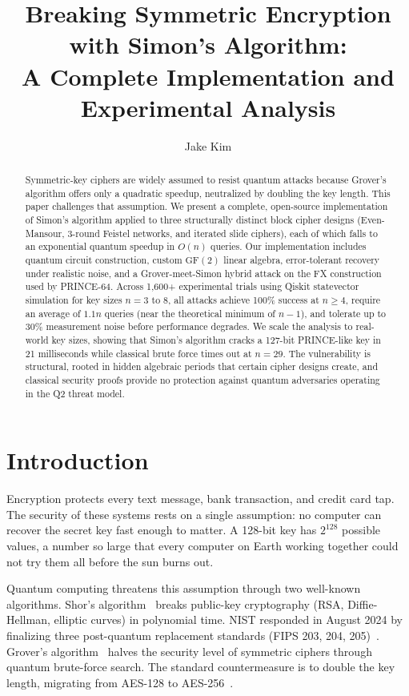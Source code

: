 \documentclass[11pt]{article}
\title{Breaking Symmetric Encryption with Simon's Algorithm:\\A Complete Implementation and Experimental Analysis}
\author{Jake Kim}
\affil{Quantum and Optics Lab, Thomas Jefferson High School for Science and Technology}
\date{}
\begin{document}
\maketitle

\begin{abstract}
Symmetric-key ciphers are widely assumed to resist quantum attacks because Grover's algorithm offers only a quadratic speedup, neutralized by doubling the key length. This paper challenges that assumption. We present a complete, open-source implementation of Simon's algorithm applied to three structurally distinct block cipher designs (Even-Mansour, 3-round Feistel networks, and iterated slide ciphers), each of which falls to an exponential quantum speedup in $O(n)$ queries. Our implementation includes quantum circuit construction, custom $\text{GF}(2)$ linear algebra, error-tolerant recovery under realistic noise, and a Grover-meet-Simon hybrid attack on the FX construction used by PRINCE-64. Across 1,600+ experimental trials using Qiskit statevector simulation for key sizes $n = 3$ to $8$, all attacks achieve 100\% success at $n \geq 4$, require an average of $1.1n$ queries (near the theoretical minimum of $n-1$), and tolerate up to 30\% measurement noise before performance degrades. We scale the analysis to real-world key sizes, showing that Simon's algorithm cracks a 127-bit PRINCE-like key in 21 milliseconds while classical brute force times out at $n=29$. The vulnerability is structural, rooted in hidden algebraic periods that certain cipher designs create, and classical security proofs provide no protection against quantum adversaries operating in the Q2 threat model.
\end{abstract}

\section{Introduction}

Encryption protects every text message, bank transaction, and credit card tap. The security of these systems rests on a single assumption: no computer can recover the secret key fast enough to matter. A 128-bit key has $2^{128}$ possible values, a number so large that every computer on Earth working together could not try them all before the sun burns out.

Quantum computing threatens this assumption through two well-known algorithms. Shor's algorithm~\cite{shor1997} breaks public-key cryptography (RSA, Diffie-Hellman, elliptic curves) in polynomial time. NIST responded in August 2024 by finalizing three post-quantum replacement standards (FIPS 203, 204, 205)~\cite{nist2024}. Grover's algorithm~\cite{grover1996} halves the security level of symmetric ciphers through quantum brute-force search. The standard countermeasure is to double the key length, migrating from AES-128 to AES-256~\cite{bernstein2009}.
\end{document}
